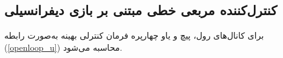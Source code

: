 \documentclass{CCI2020}
\begin{document}
\subsection{کنترل‌کننده مربعی خطی مبتنی بر بازی دیفرانسیلی}\label{LQDG}
برای کانال‌های رول، پیچ و یاو چهارپره فرمان کنترلی بهینه  به‌صورت رابطه
(\ref{openloop_u})
محاسبه می‌شود.
\end{document}
